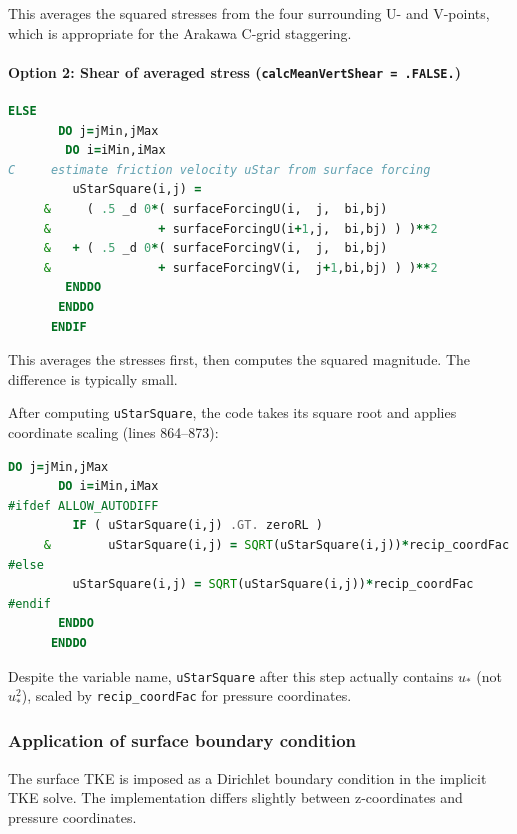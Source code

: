 \documentclass[12pt,letterpaper]{article}
\begin{document}
This averages the squared stresses from the four surrounding U- and V-points, which is appropriate for the Arakawa C-grid staggering.

\paragraph{Option 2: Shear of averaged stress (\texttt{calcMeanVertShear = .FALSE.})}

\begin{lstlisting}[language=Fortran,caption={(ggl90\_calc.F:L784--795) Surface friction velocity: Option 2}]
      ELSE
       DO j=jMin,jMax
        DO i=iMin,iMax
C     estimate friction velocity uStar from surface forcing
         uStarSquare(i,j) =
     &     ( .5 _d 0*( surfaceForcingU(i,  j,  bi,bj)
     &               + surfaceForcingU(i+1,j,  bi,bj) ) )**2
     &   + ( .5 _d 0*( surfaceForcingV(i,  j,  bi,bj)
     &               + surfaceForcingV(i,  j+1,bi,bj) ) )**2
        ENDDO
       ENDDO
      ENDIF
\end{lstlisting}

This averages the stresses first, then computes the squared magnitude. The difference is typically small.

After computing \verb|uStarSquare|, the code takes its square root and applies coordinate scaling (lines 864--873):

\begin{lstlisting}[language=Fortran,caption={(ggl90\_calc.F:L864--873) Square root and coordinate transformation}]
      DO j=jMin,jMax
       DO i=iMin,iMax
#ifdef ALLOW_AUTODIFF
         IF ( uStarSquare(i,j) .GT. zeroRL )
     &        uStarSquare(i,j) = SQRT(uStarSquare(i,j))*recip_coordFac
#else
         uStarSquare(i,j) = SQRT(uStarSquare(i,j))*recip_coordFac
#endif
       ENDDO
      ENDDO
\end{lstlisting}

Despite the variable name, \verb|uStarSquare| after this step actually contains $u_*$ (not $u_*^2$), scaled by \verb|recip_coordFac| for pressure coordinates.

\subsubsection{Application of surface boundary condition}

The surface TKE is imposed as a Dirichlet boundary condition in the implicit TKE solve. The implementation differs slightly between z-coordinates and pressure coordinates.
\end{document}
